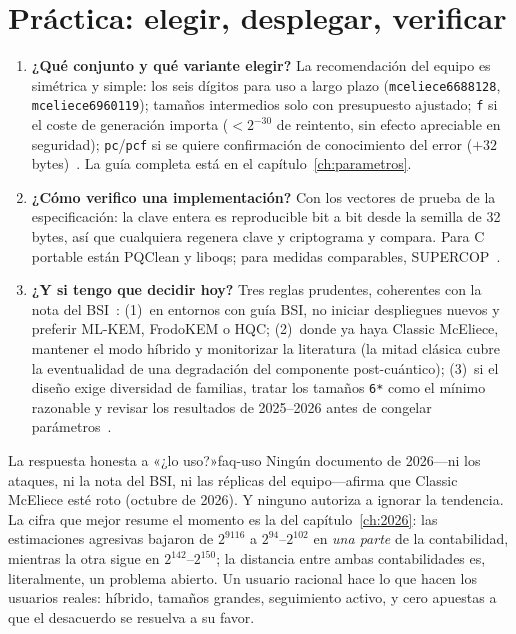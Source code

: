 \section{Práctica: elegir, desplegar, verificar}

\begin{enumerate}[leftmargin=1.9em,itemsep=5pt,start=17]
  \item \textbf{¿Qué conjunto y qué variante elegir?} La
        recomendación del equipo es simétrica y simple: los seis
        dígitos para uso a largo plazo (\texttt{mceliece6688128},
        \texttt{mceliece6960119}); tamaños intermedios solo con
        presupuesto ajustado; \texttt{f} si el coste de generación
        importa ($<2^{-30}$ de reintento, sin efecto apreciable en
        seguridad); \texttt{pc}/\texttt{pcf} si se quiere
        confirmación de conocimiento del error ($+32$
        bytes)~\cite{cmsecurity,cmiso}. La guía completa está en el
        capítulo~\ref{ch:parametros}.

  \item \textbf{¿Cómo verifico una implementación?} Con los
        vectores de prueba de la especificación: la clave entera es
        reproducible bit a bit desde la semilla de 32 bytes, así
        que cualquiera regenera clave y criptograma y compara. Para
        C portable están PQClean y liboqs; para medidas
        comparables, SUPERCOP~\cite{cmimpl}.

  \item \textbf{¿Y si tengo que decidir hoy?} Tres reglas
        prudentes, coherentes con la nota del
        BSI~\cite{bsi2026}: (1)~en entornos con guía BSI, no
        iniciar despliegues nuevos y preferir ML-KEM, FrodoKEM o
        HQC; (2)~donde ya haya Classic McEliece, mantener el modo
        híbrido y monitorizar la literatura (la mitad clásica cubre
        la eventualidad de una degradación del componente
        post-cuántico); (3)~si el diseño exige diversidad de
        familias, tratar los tamaños \texttt{6*} como el mínimo
        razonable y revisar los resultados de 2025--2026 antes de
        congelar parámetros~\cite{cm610,cmsecurity}.
\end{enumerate}

\begin{observacion}{La respuesta honesta a «¿lo uso?»}{faq-uso}
Ningún documento de 2026---ni los ataques, ni la nota del BSI, ni
las réplicas del equipo---afirma que Classic McEliece esté roto
(octubre de 2026). Y ninguno autoriza a ignorar la tendencia. La
cifra que mejor resume el momento es la del capítulo~\ref{ch:2026}:
las estimaciones agresivas bajaron de $2^{9116}$ a $2^{94}$--$2^{102}$
en \emph{una parte} de la contabilidad, mientras la otra sigue en
$2^{142}$--$2^{150}$; la distancia entre ambas contabilidades es,
literalmente, un problema abierto. Un usuario racional hace lo que
hacen los usuarios reales: híbrido, tamaños grandes, seguimiento
activo, y cero apuestas a que el desacuerdo se resuelva a su favor.
\end{observacion}

